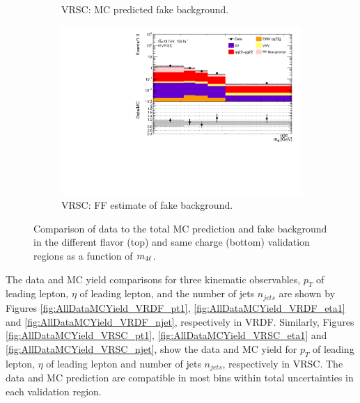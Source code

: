 \begin{figure}[!htb]
\begin{subfigure}{.48\textwidth}
        \caption{VRSC: MC predicted fake background.\label{subfig:VRSCMCRed}}
    \end{subfigure}
    \begin{subfigure}{.48\textwidth}
        \centering
        \includegraphics[width = 0.85\linewidth]{figures/Analysis/Background/Overlay_VRSC_FFApplied_M4l.pdf}
        \caption{VRSC: FF estimate of fake background.\label{subfig:VRSCFF}}
    \end{subfigure}
    \caption{ Comparison of data to the total MC prediction and fake background in the different flavor (top) and same charge (bottom) validation regions as a function of $m_{4\ell}$.\label{fig:VRDataMCYield}}
\end{figure}

The data and MC yield comparisons for three kinematic observables, $p_{T}$ of leading lepton, $\eta$ of leading lepton, and the number of jets $n_{jets}$ are shown by Figures \ref{fig:AllDataMCYield_VRDF_pt1}, \ref{fig:AllDataMCYield_VRDF_eta1} and \ref{fig:AllDataMCYield_VRDF_njet}, respectively in VRDF. Similarly, Figures \ref{fig:AllDataMCYield_VRSC_pt1}, \ref{fig:AllDataMCYield_VRSC_eta1} and \ref{fig:AllDataMCYield_VRSC_njet}, show the data and MC yield for $p_{T}$ of leading lepton, $\eta$ of leading lepton and number of jets $n_{jets}$, respectively in VRSC. The data and MC prediction are compatible in most bins within total uncertainties in each validation region.

